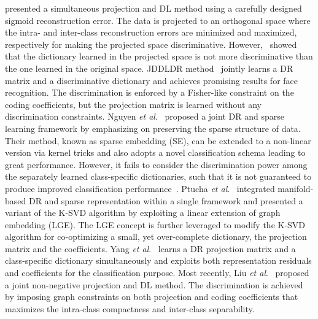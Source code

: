 \documentclass[journal]{IEEEtran}
\newcommand{\etal}{\textit{et al}.}
\begin{document}
\cite{Simul-SRC} presented a simultaneous projection and DL method using a carefully designed sigmoid reconstruction error. The data is projected to an orthogonal space where the intra- and inter-class reconstruction errors are minimized and maximized, respectively for making the projected space discriminative. However,~\cite{Invariance} showed that the dictionary learned in the projected space is not more discriminative than the one learned in the original space. JDDLDR method~\cite{JDDRDL} jointly learns a DR matrix and a discriminative dictionary and achieves promising results for face recognition. The discrimination is enforced by a Fisher-like constraint on the coding coefficients, but the projection matrix is learned without any discrimination constraints. Nguyen \etal~\cite{SE} proposed a joint DR and sparse learning framework by emphasizing on preserving the sparse structure of data. Their method, known as sparse embedding (SE), can be extended to a non-linear version via kernel tricks and also adopts a novel classification schema leading to great performance. However, it fails to consider the discrimination power among the separately learned class-specific dictionaries, such that it is not guaranteed to produce improved classification performance~\cite{Problem-SE}. 
Ptucha \etal~\cite{LGE-KSVD} integrated manifold-based DR and sparse representation within a single framework and presented a variant of the K-SVD algorithm by exploiting a linear extension of graph embedding (LGE). The LGE concept is further leveraged to modify the K-SVD algorithm for co-optimizing a small, yet over-complete dictionary, the projection matrix and the coefficients. Yang \etal~\cite{Simul-DL} learns a DR projection matrix and a class-specific dictionary simultaneously and exploits both representation residuals and coefficients for the classification purpose. Most recently, Liu \etal~\cite{JNPDL} proposed a joint non-negative projection and DL method. The discrimination is achieved by imposing graph constraints on both projection and coding coefficients that maximizes the intra-class compactness and inter-class separability.
\end{document}
